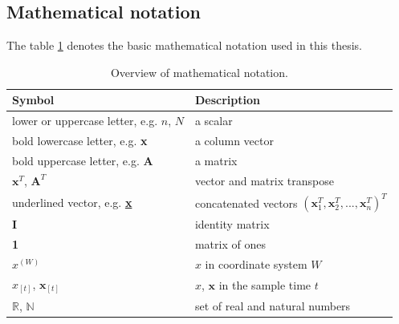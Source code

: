 \subsection{Mathematical notation}

The table \ref{tab:notation} denotes the basic mathematical notation used in this thesis.

\begin{table}[h]
\centering
\begin{tabular}{ll}
\hline
Symbol & Description \\
\hline
lower or uppercase letter, e.g. $n$, $N$ & a scalar \\
bold lowercase letter, e.g. \textbf{x} & a column vector \\ 
bold uppercase letter, e.g. \textbf{A} & a matrix \\
$\textbf{x}^T$, $\textbf{A}^T$ & vector and matrix transpose \\
underlined vector, e.g. \textbf{\underline{x}} & concatenated vectors $\left(\textbf{x}_1^T,\textbf{x}_2^T,...,\textbf{x}_n^T\right)^T$ \\
\textbf{I} & identity matrix \\
\textbf{1} & matrix of ones \\
$x^{(W)}$ & $x$ in coordinate system $W$ \\ 
$x_{[t]}$, $\textbf{x}_{[t]}$ & $x$, $\textbf{x}$ in the sample time $t$ \\
$\mathbb{R}$, $\mathbb{N}$ & set of real and natural numbers \\
\hline
\end{tabular}
\caption{Overview of mathematical notation.}
\label{tab:notation}
\end{table}

